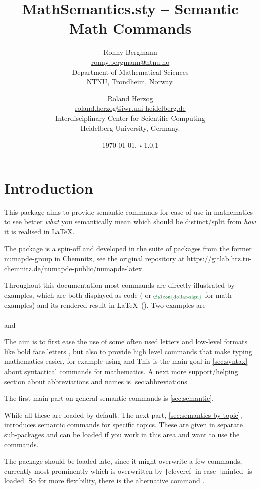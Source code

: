 \documentclass[english,a4paper,DIV=12,parskip=full,oneside]{scrartcl}
\date{\today, v\,1.0.1}
\author{%
    Ronny Bergmann\\[.25\baselineskip]%
    \small\href{mailto:ronny.bergmann@ntnu.no}{ronny.bergmann@ntnu.no}\\[.125\baselineskip]
    \small Department of Mathematical Sciences\\%
    \small NTNU, Trondheim, Norway.%
    \and
    Roland Herzog\\[.25\baselineskip]%
    \small\href{mailto:roland.herzog@iwr.uni-heidelberg.de}{roland.herzog@iwr.uni-heidelberg.de}\\[.125\baselineskip]
    \small Interdisciplinary Center for Scientific Computing\\%
    \small Heidelberg University, Germany.%
    }
\title{MathSemantics.sty – Semantic Math Commands}
\begin{document}
    \maketitle
    \tableofcontents
    \section{Introduction}
    This package aims to provide semantic commands for ease of use in mathematics
    to see better \emph{what} you semantically mean which should be distinct/split
    from \emph{how} it is realised in \LaTeX.

    The package is a spin-off and developed in the suite of packages from the former numapde-group in Chemnitz,
    see the original repository at \url{https://gitlab.hrz.tu-chemnitz.de/numapde-public/numapde-latex}.

    Throughout this documentation most commands are directly illustrated by examples, which are
    both displayed as code ( or $_{\hspace{-.5ex}\text{\color{TolMutedGreen}\faIcon{dollar-sign}}}$ for math examples) and its rendered result in \LaTeX\ (\faEye[regular]).
    Two examples are\\
    \mathCodeExample{\bbR}\\
    and\\
    \codeExample{\eg}

    The aim is to first ease the use of some often used letters and low-level formats like
    bold face letters \mathCodeExample{\bbR}, but also to provide high level commands that
    make typing mathematics easier, for example using  and  
    This is the main goal in \cref{sec:syntax} about syntactical commands for mathematics.
    A next more support/helping section about abbreviations and names is \cref{sec:abbreviations}.

    The first main part on general semantic commands is \cref{sec:semantic}.

    While all these are loaded by default. The next part, \cref{sec:semantics-by-topic},
    introduces semantic commands for specific topics.
    These are given in separate sub-packages and can be loaded if you work in this area and want to use the commands.

    The package should be loaded late, since it might overwrite a few commands,
    currently most prominently \codeCommand{\d} which is overwritten by \texttt|cleveref| in case \texttt|minted| is loaded.
    So for more flexibility, there is the alternative command \codeCommand{\dInt}.
\end{document}
